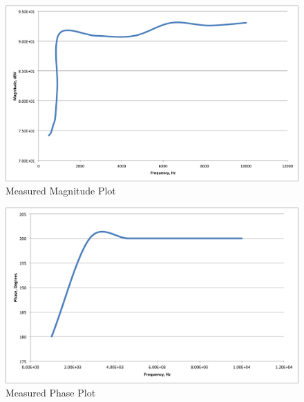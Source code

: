 \documentclass[11pt, twoside, letterpaper]{article}
\begin{document}
\begin{figure}[htbp]
\begin{center}
\includegraphics[width=7in]{measuredmag.png}
\caption{Measured Magnitude Plot}
\end{center}
\end{figure}
\FloatBarrier

\begin{figure}[htbp]
\begin{center}
\includegraphics[width=7in]{measuredphase.png}
\caption{Measured Phase Plot}
\end{center}
\end{figure}
\FloatBarrier

\newpage
\end{document}
